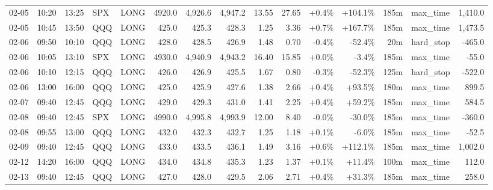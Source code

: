 \documentclass[11pt,a4paper,twoside]{article}
\begin{document}
\begin{landscape}
\begin{center}
\begin{longtable}{>{\color{txtmain}}l l l l l r r r r r r r r >{\color{txtmain}}l r}
02-05 & 10:20 & 13:25 & SPX & LONG & 4920.0 & 4,926.6 & 4,947.2 & 13.55 & 27.65 & \textcolor{wingreen}{+0.4\%} & \textcolor{wingreen}{+104.1\%} & 185m & max\_time & \textcolor{wingreen}{1,410.0} \\
02-05 & 10:45 & 13:50 & QQQ & LONG & 425.0 & 425.3 & 428.3 & 1.25 & 3.36 & \textcolor{wingreen}{+0.7\%} & \textcolor{wingreen}{+167.7\%} & 185m & max\_time & \textcolor{wingreen}{1,473.5} \\
02-06 & 09:50 & 10:10 & QQQ & LONG & 428.0 & 428.5 & 426.9 & 1.48 & 0.70 & \textcolor{lossred}{-0.4\%} & \textcolor{lossred}{-52.4\%} & 20m & hard\_stop & \textcolor{lossred}{-465.0} \\
02-06 & 10:05 & 13:10 & SPX & LONG & 4930.0 & 4,940.9 & 4,943.2 & 16.40 & 15.85 & \textcolor{wingreen}{+0.0\%} & \textcolor{lossred}{-3.4\%} & 185m & max\_time & \textcolor{lossred}{-55.0} \\
02-06 & 10:10 & 12:15 & QQQ & LONG & 426.0 & 426.9 & 425.5 & 1.67 & 0.80 & \textcolor{lossred}{-0.3\%} & \textcolor{lossred}{-52.3\%} & 125m & hard\_stop & \textcolor{lossred}{-522.0} \\
02-06 & 13:00 & 16:00 & QQQ & LONG & 425.0 & 425.9 & 427.6 & 1.38 & 2.66 & \textcolor{wingreen}{+0.4\%} & \textcolor{wingreen}{+93.5\%} & 180m & max\_time & \textcolor{wingreen}{899.5} \\
02-07 & 09:40 & 12:45 & QQQ & LONG & 429.0 & 429.3 & 431.0 & 1.41 & 2.25 & \textcolor{wingreen}{+0.4\%} & \textcolor{wingreen}{+59.2\%} & 185m & max\_time & \textcolor{wingreen}{584.5} \\
02-08 & 09:40 & 12:45 & SPX & LONG & 4990.0 & 4,995.8 & 4,993.9 & 12.00 & 8.40 & \textcolor{lossred}{-0.0\%} & \textcolor{lossred}{-30.0\%} & 185m & max\_time & \textcolor{lossred}{-360.0} \\
02-08 & 09:55 & 13:00 & QQQ & LONG & 432.0 & 432.3 & 432.7 & 1.25 & 1.18 & \textcolor{wingreen}{+0.1\%} & \textcolor{lossred}{-6.0\%} & 185m & max\_time & \textcolor{lossred}{-52.5} \\
02-09 & 09:40 & 12:45 & QQQ & LONG & 433.0 & 433.5 & 436.1 & 1.49 & 3.16 & \textcolor{wingreen}{+0.6\%} & \textcolor{wingreen}{+112.1\%} & 185m & max\_time & \textcolor{wingreen}{1,002.0} \\
02-12 & 14:20 & 16:00 & QQQ & LONG & 434.0 & 434.8 & 435.3 & 1.23 & 1.37 & \textcolor{wingreen}{+0.1\%} & \textcolor{wingreen}{+11.4\%} & 100m & max\_time & \textcolor{wingreen}{112.0} \\
02-13 & 09:40 & 12:45 & QQQ & LONG & 427.0 & 428.0 & 429.5 & 2.06 & 2.71 & \textcolor{wingreen}{+0.4\%} & \textcolor{wingreen}{+31.3\%} & 185m & max\_time & \textcolor{wingreen}{258.0} \\

\end{longtable}
\end{center}
\end{landscape}
\end{document}
